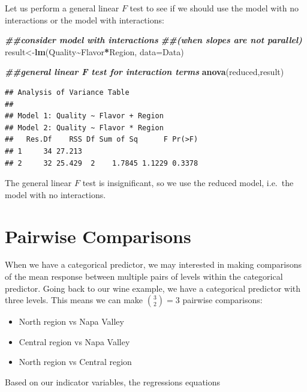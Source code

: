 \documentclass[
]{book}
\newenvironment{Shaded}{\begin{snugshade}}{\end{snugshade}}
\newcommand{\AttributeTok}[1]{\textcolor[rgb]{0.13,0.29,0.53}{#1}}
\newcommand{\DocumentationTok}[1]{\textcolor[rgb]{0.56,0.35,0.01}{\textbf{\textit{#1}}}}
\newcommand{\FunctionTok}[1]{\textcolor[rgb]{0.13,0.29,0.53}{\textbf{#1}}}
\newcommand{\NormalTok}[1]{#1}
\newcommand{\OtherTok}[1]{\textcolor[rgb]{0.56,0.35,0.01}{#1}}
\newcommand{\SpecialCharTok}[1]{\textcolor[rgb]{0.81,0.36,0.00}{\textbf{#1}}}
\providecommand{\tightlist}{%
  \setlength{\itemsep}{0pt}\setlength{\parskip}{0pt}}
\begin{document}
Let us perform a general linear \(F\) test to see if we should use the model with no interactions or the model with interactions:

\begin{Shaded}
\begin{Highlighting}[]
\DocumentationTok{\#\#consider model with interactions }
\DocumentationTok{\#\#(when slopes are not parallel)}
\NormalTok{result}\OtherTok{\textless{}{-}}\FunctionTok{lm}\NormalTok{(Quality}\SpecialCharTok{\textasciitilde{}}\NormalTok{Flavor}\SpecialCharTok{*}\NormalTok{Region, }\AttributeTok{data=}\NormalTok{Data)}

\DocumentationTok{\#\#general linear F test for interaction terms}
\FunctionTok{anova}\NormalTok{(reduced,result)}
\end{Highlighting}
\end{Shaded}

\begin{verbatim}
## Analysis of Variance Table
## 
## Model 1: Quality ~ Flavor + Region
## Model 2: Quality ~ Flavor * Region
##   Res.Df    RSS Df Sum of Sq      F Pr(>F)
## 1     34 27.213                           
## 2     32 25.429  2    1.7845 1.1229 0.3378
\end{verbatim}

The general linear \(F\) test is insignificant, so we use the reduced model, i.e.~the model with no interactions.

\hypertarget{pairwise-comparisons}{%
\section{Pairwise Comparisons}\label{pairwise-comparisons}}

When we have a categorical predictor, we may interested in making comparisons of the mean response between multiple pairs of levels within the categorical predictor. Going back to our wine example, we have a categorical predictor with three levels. This means we can make \(\binom{3}{2} = 3\) pairwise comparisons:

\begin{itemize}
\tightlist
\item
  North region vs Napa Valley
\item
  Central region vs Napa Valley
\item
  North region vs Central region
\end{itemize}

Based on our indicator variables, the regressions equations
\end{document}
